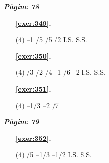\hyperlink{page.78}{\textbf{\em Pàgina 78}}
\begin{enumerate}



 \item[\fontfamily{phv}\selectfont\color{blue}\textbf{\ref{exer:349}. }] \label{ans:349}
 \begin{tasks}[column-sep=1em, item-indent=1.3333em](4)
	 \task --1
	 /5
	 /5
	 /2
	 \task I.S.
	 \task S.S.
\end{tasks}
 \end{enumerate}
\begin{enumerate}



 \item[\fontfamily{phv}\selectfont\color{blue}\textbf{\ref{exer:350}. }] \label{ans:350}
 \begin{tasks}[column-sep=1em, item-indent=1.3333em](4)
	 /3
	 /2
	 /4
	 \task --1
	 /6
	 \task --2
	 \task I.S.
	 \task S.S.
\end{tasks}



 \item[\fontfamily{phv}\selectfont\color{blue}\textbf{\ref{exer:351}. }] \label{ans:351}
 \begin{tasks}[column-sep=1em, item-indent=1.3333em](4)
	 \task --1/3
	 \task --2
	 /7
\end{tasks}
 \end{enumerate}
\vspace{0.3cm}


\hyperlink{page.79}{\textbf{\em Pàgina 79}}
\begin{enumerate}



 \item[\fontfamily{phv}\selectfont\color{blue}\textbf{\ref{exer:352}. }] \label{ans:352}
 \begin{tasks}[column-sep=1em, item-indent=1.3333em](4)
	 /5
	 \task --1/3
	 \task --1/2
	 \task I.S.
	 \task S.S.
\end{tasks}
 \end{enumerate}
\vspace{0.3cm}


